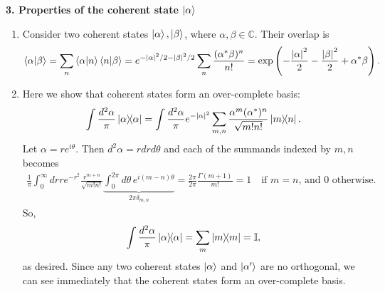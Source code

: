 \documentclass{article}
\theoremstyle{definition}
\newcommand{\al}{\alpha}
\newcommand{\be}{\beta}
\newcommand{\f}[2]{\frac{#1}{#2}}
\newcommand{\lp}{\left(}
\newcommand{\rp}{\right)}
\begin{document}
\noindent \textbf{3. Properties of the coherent state $\ket{\al}$}

\begin{enumerate}[label=\alph*)]
	\item Consider two coherent states $\ket{\al}, \ket{\be}$, where $\al,\be\in \mathbb{C}$. Their overlap is 
	\begin{align*}
		\bra{\al}\ket{\be} = \sum_n \braket{\al}{n}\braket{n}{\be} 
		= e^{-\abs{\al}^2/2 -\abs{\be}^2/2 }  \sum_n \f{(\al^* \be)^n}{n!} = \exp\lp -\f{\abs{\al}^2}{2} -\f{\abs{\be}^2}{2} + \al^*\be  \rp.
	\end{align*}


	\item Here we show that coherent states form an over-complete basis:
	\begin{align*}
		\int \f{d^2\al}{\pi} \ketbra{\al} = \int \f{d^2\al}{\pi} e^{-\abs{\al}^2} \sum_{m,n} \f{\al^m (\al^*)^n}{\sqrt{m!n!}} \ketbra{m}{n}.
	\end{align*}
	Let $\al = re^{i\theta}$. Then $d^2\al = r drd\theta$ and each of the summands indexed by $m,n$ becomes
	\begin{align*}
	\f{1}{\pi}\int_0^\infty dr r  e^{-r^2}  \f{r^{m+n}}{\sqrt{m!n!}} \underbrace{ \int_{0}^{2\pi} d\theta\, e^{i(m-n)\theta} }_{2\pi \delta_{m,n}} = \f{2\pi}{2\pi}\f{\Gamma(m+1)}{m!} = 1  \quad  \text{if $m=n$, and $0$ otherwise}.
	\end{align*}
	So, 
	\begin{align*}
	\int \f{d^2 \al}{\pi} \ketbra{\al} = \sum_m \ketbra{m} =  \mathbb{I},
	\end{align*}
	as desired. Since any two coherent states $\ket{\al}$ and $\ket{\al'}$ are no orthogonal, we can see immediately that the coherent states form an over-complete basis.
	

\end{enumerate}
\end{document}

